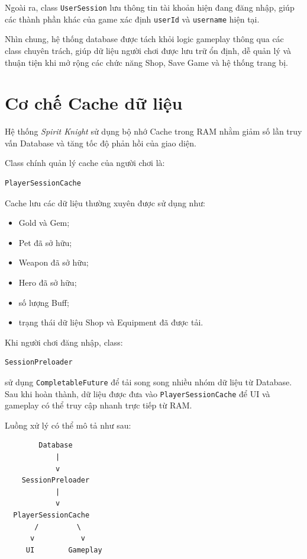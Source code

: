 \documentclass[12pt,a4paper]{report}
\begin{document}
    Ngoài ra, class \texttt{UserSession} lưu thông tin tài khoản hiện
    đang đăng nhập, giúp các thành phần khác của game xác định
    \texttt{userId} và \texttt{username} hiện tại.

    Nhìn chung, hệ thống database được tách khỏi logic gameplay thông qua
    các class chuyên trách, giúp dữ liệu người chơi được lưu trữ ổn định,
    dễ quản lý và thuận tiện khi mở rộng các chức năng Shop, Save Game
    và hệ thống trang bị.


    \section{Cơ chế Cache dữ liệu}

    Hệ thống \textit{Spirit Knight} sử dụng bộ nhớ Cache trong RAM nhằm
    giảm số lần truy vấn Database và tăng tốc độ phản hồi của giao diện.

    Class chính quản lý cache của người chơi là:

    \begin{verbatim}
PlayerSessionCache
    \end{verbatim}

    Cache lưu các dữ liệu thường xuyên được sử dụng như:

    \begin{itemize}
        \item Gold và Gem;
        \item Pet đã sở hữu;
        \item Weapon đã sở hữu;
        \item Hero đã sở hữu;
        \item số lượng Buff;
        \item trạng thái dữ liệu Shop và Equipment đã được tải.
    \end{itemize}

    Khi người chơi đăng nhập, class:

    \begin{verbatim}
SessionPreloader
    \end{verbatim}

    sử dụng \texttt{CompletableFuture} để tải song song nhiều nhóm dữ liệu
    từ Database. Sau khi hoàn thành, dữ liệu được đưa vào
    \texttt{PlayerSessionCache} để UI và gameplay có thể truy cập nhanh
    trực tiếp từ RAM.

    Luồng xử lý có thể mô tả như sau:

    \begin{verbatim}
        Database
            |
            v
    SessionPreloader
            |
            v
  PlayerSessionCache
       /         \
      v           v
     UI        Gameplay
    \end{verbatim}
\end{document}
